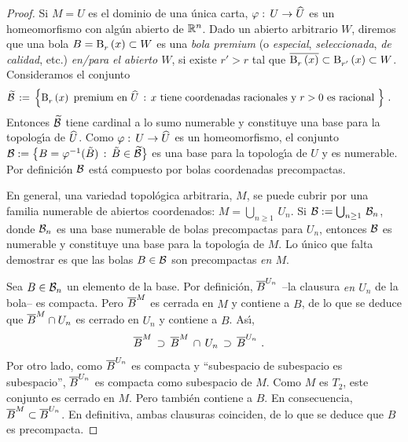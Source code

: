 \begin{proof}
	Si $M=U$ es el dominio de una \'{u}nica carta,
	$\varphi:\,U\rightarrow\encoordenadas{U}$ es un homeomorfismo con
	alg\'{u}n abierto de $\bb R^n$. Dado un abierto arbitrario $W$, diremos
	que una bola $B=\bola{r}{x}\subset W$ es una \emph{bola premium} (o
	\emph{especial}, \emph{seleccionada}, \emph{de calidad}, etc.)
	\emph{en/para el abierto $W$}, si existe $r'>r$ tal que
	$\clos{\bola{r}{x}}\subset\bola{r'}{x}\subset W$. Consideramos el
	conjunto
	\begin{align*}
		\widetilde{\cal B} & \,:=\,
			\Big\{\bola{r}{x} \text{ premium en }
				\encoordenadas{U}\,:\,x
			\text{ tiene coordenadas racionales y } r>0
			\text{ es racional }\Big\}
		\text{ .}
	\end{align*}
	Entonces $\widetilde{\cal B}$ tiene cardinal a lo sumo numerable y
	constituye una base para la topolog\'{\i}a de $\encoordenadas{U}$. Como
	$\varphi:\,U\rightarrow\encoordenadas{U}$ es un homeomorfismo, el
	conjunto
	\begin{math}
		\cal B:=\big\{ B=\varphi^{-1}(\tilde B)\,:\,
			\tilde B\in\widetilde{\cal B}\big\}
	\end{math} es una base para la topolog\'{\i}a de $U$ y es numerable.
	Por definici\'{o}n $\cal B$ est\'{a} compuesto por bolas coordenadas
	precompactas.

	En general, una variedad topol\'{o}gica arbitraria, $M$, se puede
	cubrir por una familia numerable de abiertos coordenados:
	\begin{math}
		M=\bigcup_{n\geq 1}\,U_n
	\end{math}. Si
	\begin{math}
		\cal B:=\bigcup_{n\geq 1}\,\cal B_n
	\end{math}, donde $\cal B_n$ es una base numerable de bolas
	precompactas para $U_n$, entonces $\cal B$ es numerable y constituye
	una base para la topolog\'{\i}a de $M$. Lo \'{u}nico que falta
	demostrar es que las bolas $B\in\cal B$ son precompactas \emph{en $M$}.

	Sea $B\in\cal B_n$ un elemento de la base. Por definici\'{o}n,
	$\clos B^{U_n}$ --la clausura \emph{en $U_n$} de la bola-- es compacta.
	Pero $\clos B^M$ es cerrada en $M$ y contiene a $B$, de lo que se
	deduce que $\clos B^M\cap U_n$ es cerrado en $U_n$ y contiene a $B$.
	As\'{\i},
	\begin{align*}
		\clos B^M & \,\supset\,\clos B^M\,\cap\,U_n\,\supset\,
			\clos B^{U_n}
		\text{ .}
	\end{align*}
	Por otro lado, como $\clos B^{U_n}$ es compacta y ``subespacio de
	subespacio es subespacio'', $\clos B^{U_n}$ es compacta como subespacio
	de $M$. Como $M$ es $T_2$, este conjunto es cerrado en $M$. Pero
	tambi\'{e}n contiene a $B$. En consecuencia,
	$\clos B^M\subset\clos B^{U_n}$. En definitiva, ambas clausuras
	coinciden, de lo que se deduce que $B$ es precompacta.
\end{proof}

